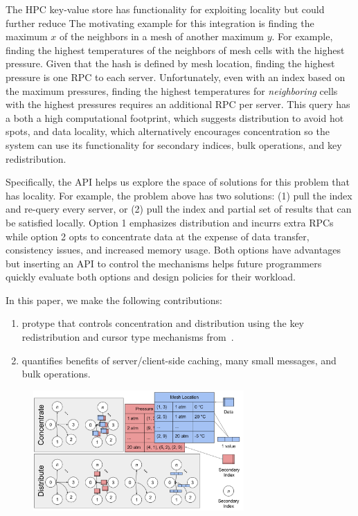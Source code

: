 The HPC key-value store has functionality for exploiting locality but could
further reduce The motivating example for this integration is finding the
maximum \(x\) of the neighbors in a mesh of another maximum \(y\). For example,
finding the highest temperatures of the neighbors of mesh cells with the
highest pressure. Given that the hash is defined by mesh location, finding the
highest pressure is one RPC to each server.  Unfortunately, even with an index
based on the maximum pressures, finding the highest temperatures for {\it
neighboring} cells with the highest pressures requires an additional RPC per
server.  This query has a both a high computational footprint, which suggests
distribution to avoid hot spots, and data locality, which alternatively
encourages concentration so the system can use its functionality for secondary
indices, bulk operations, and key redistribution. 

Specifically, the API helps us explore the space of solutions for this problem
that has locality. For example, the problem above has two solutions: (1) pull
the index and re-query every server, or (2) pull the index and partial set of
results that can be satisfied locally. Option 1 emphasizes distribution and
incurrs extra RPCs while option 2 opts to concentrate data at the expense of
data transfer, consistency issues, and increased memory usage.  Both options
have advantages but inserting an API to control the mechanisms helps future
programmers quickly evaluate both options and design policies for their
workload.

In this paper, we make the following contributions:

\begin{enumerate}

  \item protype that controls concentration and distribution using the key
  redistribution and cursor type mechanisms
  from~\cite{greenberg:hotstorage2015-mdhim}. 

  \item quantifies benefits of server/client-side caching, many small messages,
  and bulk operations.

\end{enumerate}

\begin{figure}
\noindent\includegraphics[width=19pc,angle=0]{figures/example.png}\\
\end{figure}


